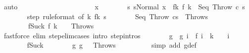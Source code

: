 \begin{isabellebody}
\ auto\isanewline
\ \ \ \ \isacommand{{\isacharbraceright}}\isamarkupfalse%
\isanewline
\ \ \ \ \isamarkupfalse%
\isanewline
\ \ \ \ \isacommand{{\isacharbraceleft}}\isamarkupfalse%
\isanewline
\ \ \ \ \ \ \isamarkupfalse%
\ x\isanewline
\ \ \ \ \ \ \isamarkupfalse%
\ s{\isacharprime}{\isacharcolon}\ {\isachardoublequoteopen}s{\isacharprime}{\isacharequal}Normal\ x{\isachardoublequoteclose}\ \ f{\isacharunderscore}k{\isacharcolon}\ {\isachardoublequoteopen}f\ k\ {\isacharequal}\ {\isacharparenleft}Seq\ Throw\ c\ s{\isacharprime}{\isacharparenright}{\isachardoublequoteclose}\isanewline
\ \ \ \ \ \ \isamarkupfalse%
\ step\ {\isacharbrackleft}rule{\isacharunderscore}format{\isacharcomma}\ of\ k{\isacharbrackright}\ f{\isacharunderscore}k\ s{\isacharprime}\isanewline
\ \ \ \ \ \ \isamarkupfalse%
\ {\isachardoublequoteopen}{\isasymGamma}{\isasymturnstile}{\isacharparenleft}Seq\ Throw\ cs{\isacharprime}{\isacharparenright}\ {\isasymrightarrow}\ {\isacharparenleft}Throw{\isacharcomma}s{\isacharprime}{\isacharparenright}{\isachardoublequoteclose}\ \isanewline
\ \ \ \ \ \ \ \ f{\isacharunderscore}Suc{\isacharunderscore}k{\isacharcolon}\ {\isachardoublequoteopen}f\ {\isacharparenleft}k\ {\isacharplus}\ {}{\isacharparenright}\ {\isacharequal}\ {\isacharparenleft}Throw{\isacharcomma}s{\isacharprime}{\isacharparenright}{\isachardoublequoteclose}\isanewline
\ \ \ \ \ \ \ \ \isamarkupfalse%
\ {\isacharparenleft}fastforce\ elim{\isacharcolon}\ step{\isacharunderscore}elim{\isacharunderscore}cases\ intro{\isacharcolon}\ step{\isachardot}intros{\isacharparenright}\isanewline
\ \ \ \ \ \ \isamarkupfalse%
\ g\ \ {\isachardoublequoteopen}g\ i\ {\isacharequal}\ f\ {\isacharparenleft}i\ {\isacharplus}\ {\isacharparenleft}k\ {\isacharplus}\ {}{\isacharparenright}{\isacharparenright}{\isachardoublequoteclose}\ \ i\isanewline
\ \ \ \ \ \ \isamarkupfalse%
\ f{\isacharunderscore}Suc{\isacharunderscore}k\isanewline
\ \ \ \ \ \ \isamarkupfalse%
\ g{\isacharunderscore}{}{\isacharcolon}\ {\isachardoublequoteopen}g\ {}\ {\isacharequal}\ {\isacharparenleft}Throw{\isacharcomma}s{\isacharprime}{\isacharparenright}{\isachardoublequoteclose}\isanewline
\ \ \ \ \ \ \ \ \isamarkupfalse%
\ {\isacharparenleft}simp\ add{\isacharcolon}\ g{\isacharunderscore}def{\isacharparenright}\isanewline

\end{isabellebody}

